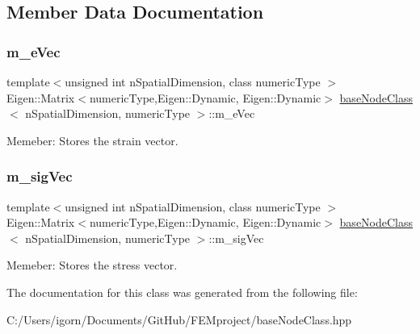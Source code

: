 \subsection{Member Data Documentation}
\mbox{\label{classbase_node_class_a754f5d47539b21d91a48d600efa05b5a}} 
\subsubsection{\texorpdfstring{m\+\_\+e\+Vec}{m\_eVec}}
{\footnotesize\ttfamily template$<$unsigned int n\+Spatial\+Dimension, class numeric\+Type $>$ \\
Eigen\+::\+Matrix$<$numeric\+Type,Eigen\+::\+Dynamic, Eigen\+::\+Dynamic$>$ \mbox{\hyperlink{classbase_node_class}{base\+Node\+Class}}$<$ n\+Spatial\+Dimension, numeric\+Type $>$\+::m\+\_\+e\+Vec\hspace{0.3cm}{\ttfamily [protected]}}

Memeber\+: Stores the strain vector. \mbox{\label{classbase_node_class_ad0381fa3d308b32934e3188bd7c2df84}} 
\subsubsection{\texorpdfstring{m\+\_\+sig\+Vec}{m\_sigVec}}
{\footnotesize\ttfamily template$<$unsigned int n\+Spatial\+Dimension, class numeric\+Type $>$ \\
Eigen\+::\+Matrix$<$numeric\+Type,Eigen\+::\+Dynamic, Eigen\+::\+Dynamic$>$ \mbox{\hyperlink{classbase_node_class}{base\+Node\+Class}}$<$ n\+Spatial\+Dimension, numeric\+Type $>$\+::m\+\_\+sig\+Vec\hspace{0.3cm}{\ttfamily [protected]}}

Memeber\+: Stores the stress vector. 

The documentation for this class was generated from the following file\+:\begin{DoxyCompactItemize}
\item 
C\+:/\+Users/igorn/\+Documents/\+Git\+Hub/\+F\+E\+Mproject/base\+Node\+Class.\+hpp\end{DoxyCompactItemize}
